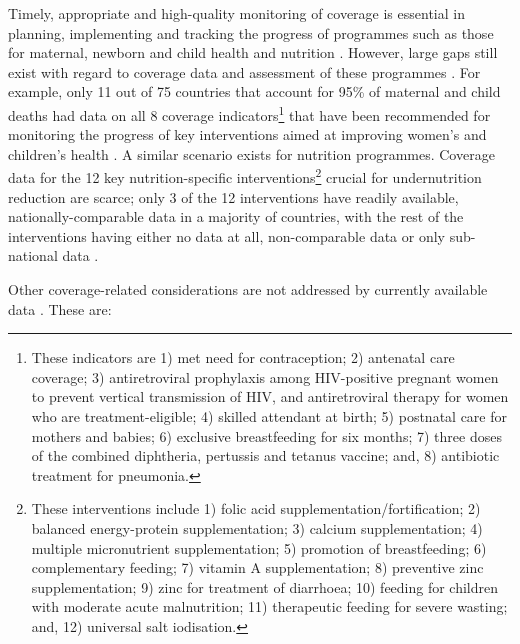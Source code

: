 \documentclass[12pt,a4paper]{article}
\begin{document}
Timely, appropriate and high-quality monitoring of coverage is essential in planning, implementing and tracking the progress of programmes such as those for maternal, newborn and child health and nutrition \citep{Bryce:2013dd}. However, large gaps still exist with regard to coverage data and assessment of these programmes \citep{Bryce:2008kf, Bryce:2013dd, InternationalFoodPolicyResearchInstitute:2014wj}. For example, only 11 out of 75 countries that account for 95\% of maternal and child deaths had data on all 8 coverage indicators\footnote{These indicators are 1) met need for contraception; 2) antenatal care coverage; 3) antiretroviral prophylaxis among HIV-positive pregnant women to prevent vertical transmission of HIV, and antiretroviral therapy for women who are treatment-eligible; 4) skilled attendant at birth; 5) postnatal care for mothers and babies; 6) exclusive breastfeeding for six months; 7) three doses of the combined diphtheria, pertussis and tetanus vaccine; and, 8) antibiotic treatment for pneumonia.} that have been recommended for monitoring the progress of key interventions aimed at improving women's and children's health \citep{independentExpertReviewGrouponInformationandAccountabilityforWomensandChildrensHealth:2013uc}. A similar scenario exists for nutrition programmes. Coverage data for the 12 key nutrition-specific interventions\footnote{These interventions include 1) folic acid supplementation/fortification; 2) balanced energy-protein supplementation; 3) calcium supplementation; 4) multiple micronutrient supplementation; 5) promotion of breastfeeding; 6) complementary feeding; 7) vitamin A supplementation; 8) preventive zinc supplementation; 9) zinc for treatment of diarrhoea; 10) feeding for children with moderate acute malnutrition; 11) therapeutic feeding for severe wasting; and, 12) universal salt iodisation.} crucial for undernutrition reduction \citep{Bhutta:2008p10829, Bhutta:2013ks, Bhutta:2013cf, InternationalFoodPolicyResearchInstitute:2014wj} are scarce; only 3 of the 12 interventions have readily available, nationally-comparable data in a majority of countries, with the rest of the interventions having either no data at all, non-comparable data or only sub-national data \citep{InternationalFoodPolicyResearchInstitute:2014wj}.

Other coverage-related considerations are not addressed by currently available data \citep{Guevarra:2014ta}. These are:
\end{document}
